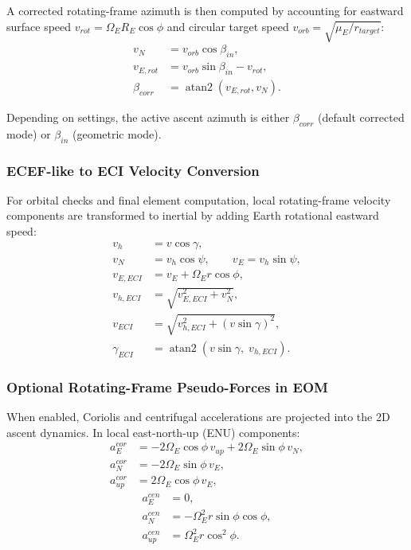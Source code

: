 A corrected rotating-frame azimuth is then computed by accounting for eastward surface speed $v_{rot}=\Omega_E R_E\cos\phi$ and circular target speed $v_{orb}=\sqrt{\mu_E/r_{target}}$:
\begin{align}
 v_N &= v_{orb}\cos\beta_{in}, \\
 v_{E,rot} &= v_{orb}\sin\beta_{in} - v_{rot}, \\
 \beta_{corr} &= \operatorname{atan2}(v_{E,rot}, v_N).
\end{align}

Depending on settings, the active ascent azimuth is either $\beta_{corr}$ (default corrected mode) or $\beta_{in}$ (geometric mode).

\subsubsection{ECEF-like to ECI Velocity Conversion}

For orbital checks and final element computation, local rotating-frame velocity components are transformed to inertial by adding Earth rotational eastward speed:
\begin{align}
 v_h &= v\cos\gamma, \\
 v_N &= v_h\cos\psi, \qquad v_E = v_h\sin\psi, \\
 v_{E,ECI} &= v_E + \Omega_E r\cos\phi, \\
 v_{h,ECI} &= \sqrt{v_{E,ECI}^2 + v_N^2}, \\
 v_{ECI} &= \sqrt{v_{h,ECI}^2 + (v\sin\gamma)^2}, \\
 \gamma_{ECI} &= \operatorname{atan2}(v\sin\gamma,\; v_{h,ECI}).
\end{align}

\subsubsection{Optional Rotating-Frame Pseudo-Forces in EOM}

When enabled, Coriolis and centrifugal accelerations are projected into the 2D ascent dynamics. In local east-north-up (ENU) components:
\begin{align}
 a^{cor}_E &= -2\Omega_E\cos\phi\,v_{up} + 2\Omega_E\sin\phi\,v_N, \\
 a^{cor}_N &= -2\Omega_E\sin\phi\,v_E, \\
 a^{cor}_{up} &= 2\Omega_E\cos\phi\,v_E,
\end{align}
\begin{align}
 a^{cen}_E &= 0, \\
 a^{cen}_N &= -\Omega_E^2 r\sin\phi\cos\phi, \\
 a^{cen}_{up} &= \Omega_E^2 r\cos^2\phi.
\end{align}

